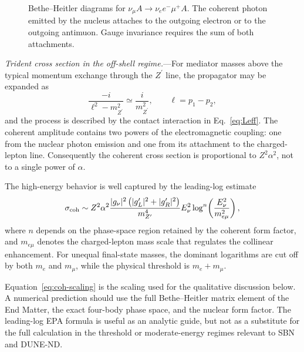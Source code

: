 \documentclass[
  aps,
  prl,
  twocolumn,
  superscriptaddress,
  amsmath, amssymb,
  floatfix, nofootinbib,
  longbibliography,
]{revtex4-2}
\newcommand{\numu}{\nu_\mu}
\newcommand{\nue}{\nu_e}
\newcommand{\Zp}{Z^{\prime}}
\newcommand{\mZp}{m_{\Zp}}
\newcommand{\Enu}{E_\nu}
\newcommand{\gL}{{g^{\prime}_L}}
\newcommand{\gR}{{g^{\prime}_R}}
\newcommand{\gnu}{{g_\nu}}
\begin{document}
\begin{figure}[t]
  \centering
  \caption{Bethe--Heitler diagrams for
    $\numu A\to\nue e^-\mu^+A$.  The coherent photon emitted by the
    nucleus attaches to the outgoing electron or to the outgoing
    antimuon.  Gauge invariance requires the sum of both attachments.}
  \label{fig:diagrams}
\end{figure}

\textit{Trident cross section in the off-shell regime.}---For mediator
masses above the typical momentum exchange through the $\Zp$ line, the
propagator may be expanded as
\begin{equation}
  \frac{-i}{\ell^2-\mZp^2}
  \simeq
  \frac{i}{\mZp^2},
  \qquad
  \ell=p_1-p_2,
\end{equation}
and the process is described by the contact interaction in
Eq.~\eqref{eq:Leff}.  The coherent amplitude contains two powers of
the electromagnetic coupling: one from the nuclear photon emission and
one from its attachment to the charged-lepton line.  Consequently the
coherent cross section is proportional to $Z^2\alpha^2$, not to a
single power of $\alpha$.

The high-energy behavior is well captured by the leading-log estimate
\begin{equation}
  \sigma_{\rm coh}
  \sim
  Z^2\alpha^2
  \frac{|\gnu|^2\left(|\gL|^2+|\gR|^2\right)}{\mZp^4}
  \Enu^2
  \log^n\!\left(\frac{\Enu^2}{m_{e\mu}^2}\right),
\label{eq:coh-scaling}
\end{equation}
where $n$ depends on the phase-space region retained by the coherent
form factor, and $m_{e\mu}$ denotes the charged-lepton mass scale that
regulates the collinear enhancement.  For unequal final-state masses,
the dominant logarithms are cut off by both $m_e$ and $m_\mu$, while
the physical threshold is $m_e+m_\mu$.

Equation~\eqref{eq:coh-scaling} is the scaling used for the qualitative
discussion below.  A numerical prediction should use the full
Bethe--Heitler matrix element of the End Matter, the exact four-body
phase space, and the nuclear form factor.  The leading-log EPA formula
is useful as an analytic guide, but not as a substitute for the full
calculation in the threshold or moderate-energy regimes relevant to
SBN and DUNE-ND.
\end{document}
